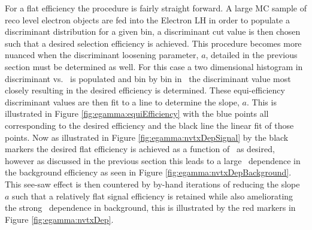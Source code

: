 For a flat efficiency the procedure is fairly straight forward.
A large MC sample of reco level electron objects are fed into the Electron LH in order to populate a discriminant distribution for a given bin, a discriminant cut value is then chosen such that a desired selection efficiency is achieved.
This procedure becomes more nuanced when the discriminant loosening parameter, $a$, detailed in the previous section must be determined as well.
For this case a two dimensional histogram in discriminant vs. \nvtx\ is populated and bin by bin in \nvtx\ the discriminant value most closely resulting in the desired efficiency is determined.
These equi-efficiency discriminant values are then fit to a line to determine the slope, $a$.
This is illustrated in Figure \ref{fig:egamma:equiEfficiency} with the blue points all corresponding to the desired efficiency and the black line the linear fit of those points.
Now as illustrated in Figure \ref{fig:egamma:nvtxDepSignal} by the black markers the desired flat efficiency is achieved as a function of \nvtx\ as desired, however as discussed in the previous section this leads to a large \nvtx\ dependence in the background efficiency as seen in Figure \ref{fig:egamma:nvtxDepBackground}.
This see-saw effect is then countered by by-hand iterations of reducing the slope $a$ such that a relatively flat signal efficiency is retained while also ameliorating the strong \nvtx\ dependence in background, this is illustrated by the red markers in Figure \ref{fig:egamma:nvtxDep}.


